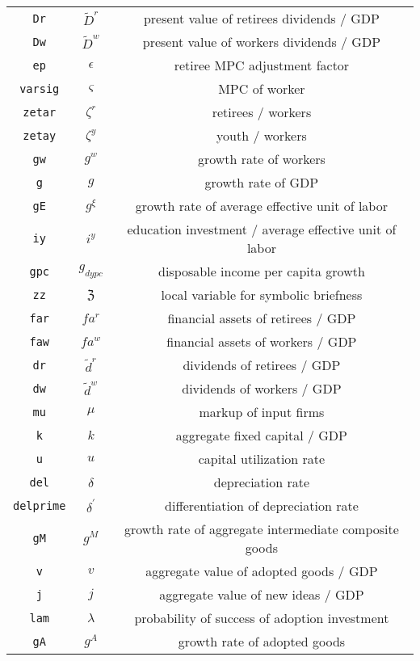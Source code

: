 \begin{center}
\begin{longtable}{ccc}
\texttt{Dr} & $\tilde{D}^r$ & present value of retirees dividends / GDP\\
\texttt{Dw} & $\tilde{D}^w$ & present value of workers dividends / GDP\\
\texttt{ep} & ${\epsilon}$ & retiree MPC adjustment factor\\
\texttt{varsig} & ${\varsigma}$ & MPC of worker\\
\texttt{zetar} & ${\zeta^{r}}$ & retirees / workers\\
\texttt{zetay} & ${\zeta^{y}}$ & youth / workers\\
\texttt{gw} & ${g^w}$ & growth rate of workers\\
\texttt{g} & ${g}$ & growth rate of GDP\\
\texttt{gE} & ${g^{\xi}}$ & growth rate of average effective unit of labor\\
\texttt{iy} & ${i^y}$ & education investment / average effective unit of labor\\
\texttt{gpc} & ${g_{dypc}}$ & disposable income per capita growth\\
\texttt{zz} & ${\mathfrak{Z}}$ & local variable for symbolic briefness\\
\texttt{far} & ${fa^r}$ & financial assets of retirees / GDP\\
\texttt{faw} & ${fa^w}$ & financial assets of workers / GDP\\
\texttt{dr} & $\tilde{d}^r$ & dividends of retirees / GDP\\
\texttt{dw} & $\tilde{d}^w$ & dividends of workers / GDP\\
\texttt{mu} & ${\mu}$ & markup of input firms\\
\texttt{k} & ${k}$ & aggregate fixed capital / GDP\\
\texttt{u} & ${u}$ & capital utilization rate\\
\texttt{del} & ${\delta}$ & depreciation rate\\
\texttt{delprime} & ${\delta^\prime}$ & differentiation of depreciation rate\\
\texttt{gM} & ${g^M}$ & growth rate of aggregate intermediate composite goods\\
\texttt{v} & ${v}$ & aggregate value of adopted goods / GDP\\
\texttt{j} & ${j}$ & aggregate value of new ideas / GDP\\
\texttt{lam} & ${\lambda}$ & probability of success of adoption investment\\
\texttt{gA} & ${g^A}$ & growth rate of adopted goods\\

\end{longtable}
\end{center}
